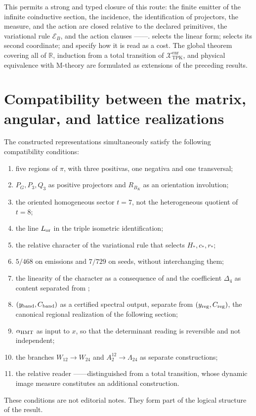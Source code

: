 This permits a strong and typed closure of this route: the finite emitter of the
infinite coinductive section, the incidence, the identification of
projectors, the measure, and the action are closed
relative to the declared primitives, the variational rule
\(\mathcal E_B\), and the action clauses \HTr--\HAdd--\HDef--\HRes--\HLoc. \HAdd
selects the linear form; \HDef selects its second coordinate; \HRes and \HLoc
specify how it is read as a cost. The global theorem covering all of
\(\mathbb R\), induction from a total transition of
\(\mathcal X_{\mathrm{TPK}}^{\mathrm{enr}}\), and physical equivalence with
M-theory are formulated as extensions of the preceding results.

\section{Compatibility between the matrix, angular, and lattice realizations}

The constructed representations simultaneously satisfy the following compatibility conditions:
\begin{enumerate}
  \item five regions of \(\pi\), with three positivas, one negativa and one
  transversal;
  \item \(P_G,P_3,Q_3\) as positive projectors and \(R_{B_K}\) as an
  orientation involution;
  \item the oriented homogeneous sector \(t=7\), not the heterogeneous quotient of \(t=8\);
  \item the line \(L_{\rm or}\) in the triple isometric identification;
  \item the relative character of the variational rule that selects
  \(H_*,c_*,r_*\);
  \item \(5/468\) on emissions and \(7/729\) on seeds, without
  interchanging them;
  \item the linearity of the character as a consequence of \HAdd and the coefficient
  \(\Delta_4\) as content separated from \HDef;
  \item \((y_{\rm band},C_{\rm band})\) as a certified spectral output, separate from
\((y_{\rm reg},C_{\rm reg})\), the canonical regional realization of the following section;
  \item \(\alpha_{\rm HMT}\) as input to \(x\), so that the determinant
  reading is reversible and not independent;
  \item the branches \(W_{12}\to W_{24}\) and
  \(A_2^{12}\to\Lambda_{24}\) as separate constructions;
  \item the relative reader \HTr--\HAdd--\HDef--\HRes--\HLoc distinguished from
  a total transition, whose dynamic image measure constitutes an
  additional construction.
\end{enumerate}

These conditions are not editorial notes. They form part of the logical structure of the result.
